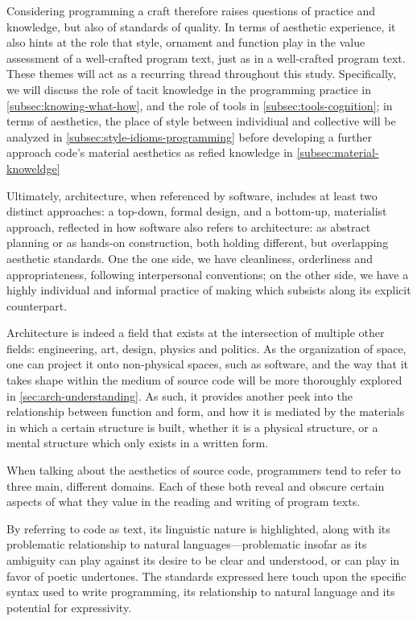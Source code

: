 Considering programming a craft therefore raises questions of practice and knowledge, but also of standards of quality. In terms of aesthetic experience, it also hints at the role that style, ornament and function play in the value assessment of a well-crafted program text, just as in a well-crafted program text. These themes will act as a recurring thread throughout this study. Specifically, we will discuss the role of tacit knowledge in the programming practice in \autoref{subsec:knowing-what-how}, and the role of tools in \autoref{subsec:tools-cognition}; in terms of aesthetics, the place of style between individiual and collective will be analyzed in \autoref{subsec:style-idioms-programming} before developing a further approach code's material aesthetics as refied knowledge in \autoref{subsec:material-knoweldge}

Ultimately, architecture, when referenced by software, includes at least two distinct approaches: a top-down, formal design, and a bottom-up, materialist approach, reflected in how software also refers to architecture: as abstract planning or as hands-on construction, both holding different, but overlapping aesthetic standards. One the one side, we have cleanliness, orderliness and appropriateness, following interpersonal conventions; on the other side, we have a highly individual and informal practice of making which subsists along its explicit counterpart.

Architecture is indeed a field that exists at the intersection of multiple other fields: engineering, art, design, physics and politics. As the organization of space, one can project it onto non-physical spaces, such as software, and the way that it takes shape within the medium of source code will be more thoroughly explored in \autoref{sec:arch-understanding}. As such, it provides another peek into the relationship between function and form, and how it is mediated by the materials in which a certain structure is built, whether it is a physical structure, or a mental structure which only exists in a written form.

\spacersmall

When talking about the aesthetics of source code, programmers tend to refer to three main, different domains. Each of these both reveal and obscure certain aspects of what they value in the reading and writing of program texts.

By referring to code as text, its linguistic nature is highlighted, along with its problematic relationship to natural languages—problematic insofar as its ambiguity can play against its desire to be clear and understood, or can play in favor of poetic undertones. The standards expressed here touch upon the specific syntax used to write programming, its relationship to natural language and its potential for expressivity.

